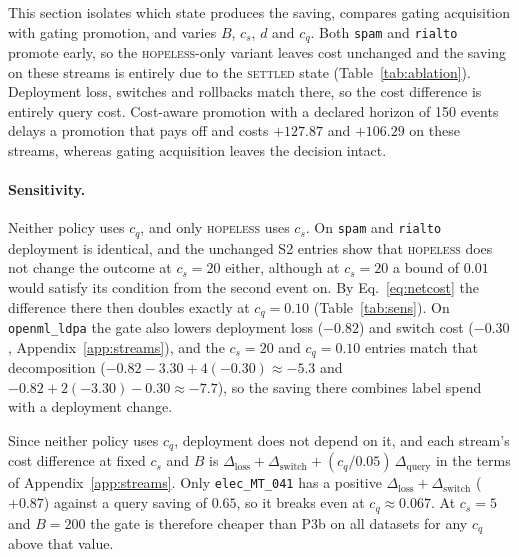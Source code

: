 \documentclass[10pt]{article}
\begin{document}
This section isolates which state produces the saving, compares gating acquisition with gating
promotion, and varies $B$, $c_s$, $d$ and $c_q$. Both \texttt{spam} and \texttt{rialto} promote
early, so the \textsc{hopeless}-only variant leaves cost unchanged and the saving on these streams
is entirely due to the \textsc{settled} state (Table~\ref{tab:ablation}). Deployment loss,
switches and rollbacks match there, so the cost difference is entirely query cost. Cost-aware
promotion with a declared horizon of 150 events delays a promotion that pays off and costs
$+127.87$ and $+106.29$ on these streams, whereas gating acquisition leaves the decision intact.

\begin{table}[!htb]\centering\small
\caption{Sensitivity of the paired cost difference (ours minus \textsf{P3b}) on \texttt{spam},
\texttt{rialto} and \texttt{openml\_ldpa}. S0 is the primary configuration; dashes mark a
configuration not evaluated.}
\label{tab:sens}

\end{table}

\paragraph{Sensitivity.}
Neither policy uses $c_q$, and only \textsc{hopeless} uses $c_s$. On \texttt{spam} and
\texttt{rialto} deployment is identical, and the unchanged S2 entries show that \textsc{hopeless}
does not change the outcome at $c_s=20$ either, although at $c_s=20$ a bound of $0.01$ would
satisfy its condition from the second event on. By Eq.~\eqref{eq:netcost} the difference there then
doubles exactly at $c_q=0.10$ (Table~\ref{tab:sens}). On \texttt{openml\_ldpa} the gate also lowers deployment loss
($-0.82$) and switch cost ($-0.30$, Appendix~\ref{app:streams}), and the $c_s=20$ and $c_q=0.10$
entries match that decomposition ($-0.82-3.30+4(-0.30)\approx-5.3$ and
$-0.82+2(-3.30)-0.30\approx-7.7$), so the saving there combines label spend with a deployment
change.

Since neither policy uses $c_q$, deployment does not depend on it, and each stream's cost difference at fixed $c_s$ and $B$
is $\Delta_{\text{loss}}+\Delta_{\text{switch}}+(c_q/0.05)\,\Delta_{\text{query}}$ in the terms of
Appendix~\ref{app:streams}. Only \texttt{elec\_MT\_041} has a positive
$\Delta_{\text{loss}}+\Delta_{\text{switch}}$ ($+0.87$) against a query saving of $0.65$, so it
breaks even at $c_q\approx0.067$. At $c_s=5$ and $B=200$ the gate is therefore cheaper than
\textsf{P3b} on all \NStreams{} datasets for any $c_q$ above that value.
\end{document}
